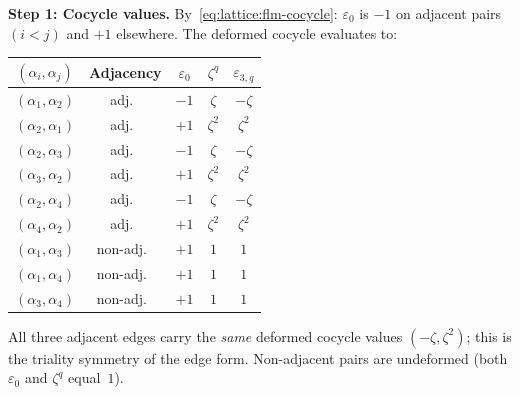 \begin{computation}[\texorpdfstring{$D_4$}{D_4} at the Coxeter root: \texorpdfstring{$N = 3$}{N = 3}, triality]
\noindent\textbf{Step 1: Cocycle values.}
By~\eqref{eq:lattice:flm-cocycle}: $\varepsilon_0$ is $-1$ on adjacent
pairs $(i < j)$ and $+1$ elsewhere.
The deformed cocycle evaluates to:
\begin{center}
\renewcommand{\arraystretch}{1.3}
{\small
\begin{tabular}{c c c c c}
$(\alpha_i,\alpha_j)$ & Adjacency
 & $\varepsilon_0$ & $\zeta^{q}$ & $\varepsilon_{3,q}$ \\
\hline
$(\alpha_1,\alpha_2)$ & adj.\ & $-1$ & $\zeta$ & $-\zeta$ \\
$(\alpha_2,\alpha_1)$ & adj.\ & $+1$ & $\zeta^2$ & $\zeta^2$ \\
$(\alpha_2,\alpha_3)$ & adj.\ & $-1$ & $\zeta$ & $-\zeta$ \\
$(\alpha_3,\alpha_2)$ & adj.\ & $+1$ & $\zeta^2$ & $\zeta^2$ \\
$(\alpha_2,\alpha_4)$ & adj.\ & $-1$ & $\zeta$ & $-\zeta$ \\
$(\alpha_4,\alpha_2)$ & adj.\ & $+1$ & $\zeta^2$ & $\zeta^2$ \\
\hline
$(\alpha_1,\alpha_3)$ & non-adj.\ & $+1$ & $1$ & $1$ \\
$(\alpha_1,\alpha_4)$ & non-adj.\ & $+1$ & $1$ & $1$ \\
$(\alpha_3,\alpha_4)$ & non-adj.\ & $+1$ & $1$ & $1$
\end{tabular}
}
\end{center}
All three adjacent edges carry the \emph{same} deformed cocycle values
$(-\zeta, \zeta^2)$; this is the triality symmetry of the edge form.
Non-adjacent pairs are undeformed (both $\varepsilon_0$ and $\zeta^q$
equal~$1$).
\smallskip


\end{computation}
